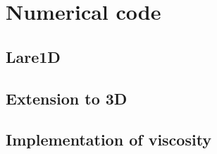 \chapter{Numerical code}

\section{Lare1D}

\section{Extension to 3D}

\section{Implementation of viscosity}

